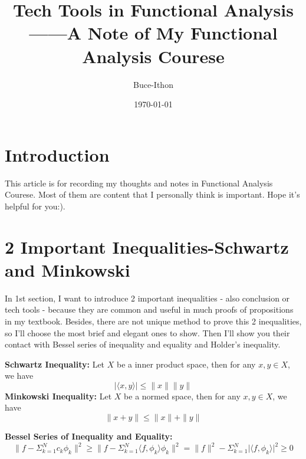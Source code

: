 \documentclass{Math_Note}
\title{Tech Tools in Functional Analysis \\ \small ------A Note of My Functional Analysis Courese}
\author{Buce-Ithon}
\date{\today}
\begin{document}
\maketitle

\newpage
\tableofcontents
\newpage

\section{Introduction}
This article is for recording my thoughts and notes in Functional Analysis Courese. Most of them are content that I personally think is important.
Hope it's helpful for you:).

\section{2 Important Inequalities-Schwartz and Minkowski}
In 1st section, I want to introduce 2 important inequalities - also conclusion or tech tools - because they are common and useful in much proofs of propositions in 
my textbook. Besides, there are not unique method to prove this 2 inequalities, so I'll choose the most brief and elegant ones to show. Then I'll show you their contact 
with Bessel series of inequality and equality and Holder's inequality.

\begin{thm}[Basic]
    \textbf{Schwartz Inequality:} Let $X$ be a inner product space, then for any $x, y \in X$, we have
    \begin{equation}
        \lvert{\langle x, y \rangle}\rvert \leq \parallel{x}\parallel \parallel{y}\parallel
    \end{equation}
    \textbf{Minkowski Inequality:} Let $X$ be a normed space, then for any $x, y \in X$, we have
    \begin{equation}
        \parallel{x + y}\parallel \leq \parallel{x}\parallel + \parallel{y}\parallel
    \end{equation}
\end{thm}

\begin{thm}[Tech]
    \textbf{Bessel Series of Inequality and Equality:} 
    \begin{equation}
        \parallel{f-\Sigma_{k=1}^{N}c_{k}\phi_{k}}\parallel^{2} \geq \parallel{f-\Sigma_{k=1}^{N}{\langle f,\phi_{k} \rangle}\phi_{k}}\parallel^{2} = \parallel{f}\parallel^{2} - \Sigma_{k=1}^{N}\lvert{\langle f,\phi_{k} \rangle}\rvert^{2} \geq 0
    \end{equation}
\end{thm}
\end{document}
